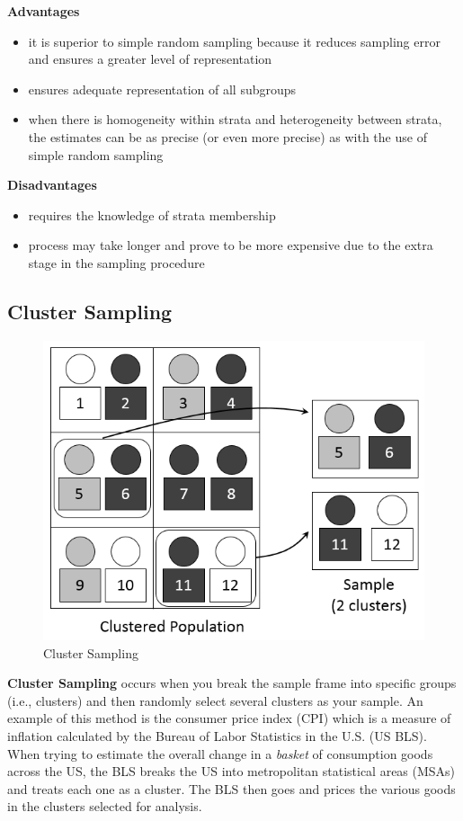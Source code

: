 \documentclass[
]{book}
\begin{document}
\textbf{Advantages}

\begin{itemize}
\item
  it is superior to simple random sampling because it reduces sampling error and ensures a greater level of representation
\item
  ensures adequate representation of all subgroups
\item
  when there is homogeneity within strata and heterogeneity between strata, the estimates can be as precise (or even more precise) as with the use of simple random sampling
\end{itemize}

\textbf{Disadvantages}

\begin{itemize}
\item
  requires the knowledge of strata membership
\item
  process may take longer and prove to be more expensive due to the extra stage in the sampling procedure
\end{itemize}

\hypertarget{cluster-sampling}{%
\subsection{Cluster Sampling}\label{cluster-sampling}}

\begin{figure}

{\centering \includegraphics[width=0.5\linewidth]{images/Cluster} 

}

\caption{Cluster Sampling}\label{fig:unnamed-chunk-25}
\end{figure}

\textbf{Cluster Sampling} occurs when you break the sample frame into specific groups (i.e., clusters) and then randomly select several clusters as your sample. An example of this method is the consumer price index (CPI) which is a measure of inflation calculated by the Bureau of Labor Statistics in the U.S. (US BLS). When trying to estimate the overall change in a \emph{basket} of consumption goods across the US, the BLS breaks the US into metropolitan statistical areas (MSAs) and treats each one as a cluster. The BLS then goes and prices the various goods in the clusters selected for analysis.
\end{document}
